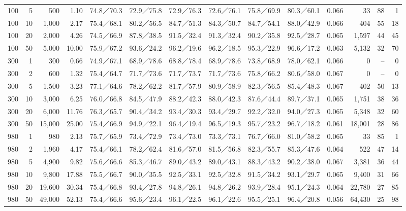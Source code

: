 {\begin{tabular}{@{}rrrr|cccccc|c|rrr@{}}
100 & 5 & 500 & 1.10 & 74.8／70.3 & 72.9／75.8 & 72.9／76.3 & 72.6／76.1 & 75.8／69.9 & 80.3／60.1 & 0.066 & 33 & 88 & 1 \\
100 & 10 & 1,000 & 2.17 & 75.4／68.1 & 80.2／56.5 & 84.7／51.3 & 84.3／50.7 & 84.7／54.1 & 88.0／42.9 & 0.066 & 404 & 55 & 18 \\
100 & 20 & 2,000 & 4.26 & 74.5／66.9 & 87.8／38.5 & 91.5／32.4 & 91.3／32.4 & 90.2／35.8 & 92.5／28.7 & 0.065 & 1,597 & 44 & 45 \\
100 & 50 & 5,000 & 10.00 & 75.9／67.2 & 93.6／24.2 & 96.2／19.6 & 96.2／18.5 & 95.3／22.9 & 96.6／17.2 & 0.063 & 5,132 & 32 & 70 \\
300 & 1 & 300 & 0.66 & 74.9／67.1 & 68.9／78.6 & 68.8／78.4 & 68.9／78.6 & 73.8／68.9 & 78.0／62.1 & 0.066 & 0 & -- & 0 \\
300 & 2 & 600 & 1.32 & 75.4／64.7 & 71.7／73.6 & 71.7／73.7 & 71.7／73.6 & 75.8／66.2 & 80.6／58.0 & 0.067 & 0 & -- & 0 \\
300 & 5 & 1,500 & 3.23 & 77.1／64.6 & 78.2／62.2 & 81.7／57.9 & 80.9／58.9 & 82.3／56.5 & 85.4／48.3 & 0.067 & 402 & 50 & 13 \\
300 & 10 & 3,000 & 6.25 & 76.0／66.8 & 84.5／47.9 & 88.2／42.3 & 88.0／42.3 & 87.6／44.4 & 89.7／37.1 & 0.065 & 1,751 & 38 & 36 \\
300 & 20 & 6,000 & 11.76 & 76.3／65.7 & 90.4／34.2 & 93.4／30.3 & 93.4／29.7 & 92.2／32.0 & 94.0／27.3 & 0.065 & 5,348 & 32 & 60 \\
300 & 50 & 15,000 & 25.00 & 75.4／66.9 & 94.9／22.1 & 96.4／19.4 & 96.5／19.3 & 95.7／23.2 & 96.7／18.2 & 0.061 & 18,001 & 28 & 86 \\
980 & 1 & 980 & 2.13 & 75.7／65.9 & 73.4／72.9 & 73.4／73.0 & 73.3／73.1 & 76.7／66.0 & 81.0／58.2 & 0.065 & 33 & 85 & 1 \\
980 & 2 & 1,960 & 4.17 & 75.4／66.1 & 78.2／62.4 & 81.6／57.0 & 81.5／56.8 & 82.3／55.7 & 85.3／47.6 & 0.064 & 522 & 47 & 14 \\
980 & 5 & 4,900 & 9.82 & 75.6／66.6 & 85.3／46.7 & 89.0／43.2 & 89.0／43.1 & 88.3／43.2 & 90.2／38.0 & 0.067 & 3,381 & 36 & 44 \\
980 & 10 & 9,800 & 17.88 & 75.5／66.7 & 90.0／35.5 & 92.5／33.1 & 92.5／32.8 & 91.5／34.2 & 93.1／29.7 & 0.065 & 9,400 & 31 & 66 \\
980 & 20 & 19,600 & 30.34 & 75.4／66.8 & 93.4／27.8 & 94.8／26.1 & 94.8／26.2 & 93.9／28.4 & 95.1／24.3 & 0.064 & 22,780 & 27 & 85 \\
980 & 50 & 49,000 & 52.13 & 75.4／66.6 & 95.6／23.4 & 96.1／22.5 & 96.1／22.6 & 95.5／25.1 & 96.4／20.8 & 0.056 & 64,430 & 25 & 98 \\
\hline
\end{tabular}}%
